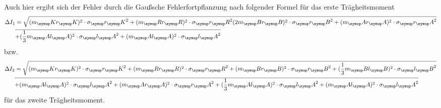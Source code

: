 \noindent Auch hier ergibt sich der Fehler durch die Gaußsche Fehlerfortpflanzung nach folgender Formel
für das erste Trägheitsmoment
\begin{align*}
  \Delta I_1 &= \sqrt{(m_\su{K}r_\su{K})^2 \cdot \sigma_\su{r_\su{K}}^2 + (m_\su{R}r_\su{R})^2 \cdot \sigma_\su{r_\su{R}}^2
  (2m_\su{B}r_\su{B})^2 \cdot \sigma_\su{r_\su{B}}^2 + (m_\su{A}r_\su{A})^2 \cdot \sigma_\su{r_\su{A}}^2}
  \\&\overline{+ (\frac{1}{3}m_\su{A}l_\su{A})^2 \cdot \sigma_\su{l_\su{A}}^2
  + (m_\su{A}l_\su{A})^2 \cdot \sigma_\su{l_\su{A}}^2}
\end{align*}
bzw.
\begin{align*}
  \Delta I_2 &= \sqrt{(m_\su{K}r_\su{K})^2 \cdot \sigma_\su{r_\su{K}}^2 + (m_\su{R}r_\su{R})^2 \cdot \sigma_\su{r_\su{R}}^2
  + (m_\su{B}r_\su{B})^2 \cdot \sigma_\su{r_\su{B}}^2 + (\frac{1}{3}m_\su{B}l_\su{B})^2 \cdot \sigma_\su{l_\su{B}}^2
  }\\&\overline{ + (m_\su{A}l_\su{A})^2 \cdot \sigma_\su{l_\su{A}}^2  + (m_\su{A}r_\su{A})^2 \cdot \sigma_\su{r_\su{A}}^2 +
  (\frac{1}{3}m_\su{A}l_\su{A})^2 \cdot \sigma_\su{l_\su{A}}^2
  + (m_\su{A}l_\su{A})^2 \cdot \sigma_\su{l_\su{A}}^2}  \\
\end{align*}
für das zweite Trägheitsmoment.
